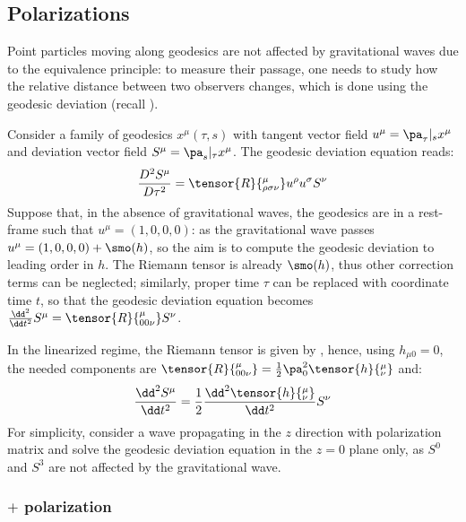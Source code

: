 \subsection{Polarizations}

Point particles moving along geodesics are not affected by gravitational waves due to the equivalence principle: to measure their passage, one needs to study how the relative distance between two observers changes, which is done using the geodesic deviation (recall ).

Consider a family of geodesics $ x^\mu(\tau,s) $ with tangent vector field $ u^\mu = \pa_\tau \vert_s x^\mu $ and deviation vector field $ S^\mu = \pa_s \vert_\tau x^\mu $. The geodesic deviation equation  reads:
\begin{equation*}
  \frac{D^2 S^\mu}{D \tau^2} = \tensor{R}{^\mu_{\rho \sigma \nu}} u^\rho u^\sigma S^\nu
\end{equation*}
Suppose that, in the absence of gravitational waves, the geodesics are in a rest-frame such that $ u^\mu = (1,0,0,0) $: as the gravitational wave passes $ u^\mu = (1,0,0,0) + \smo(h) $, so the aim is to compute the geodesic deviation to leading order in $ h $. The Riemann tensor is already $ \smo(h) $, thus other correction terms can be neglected; similarly, proper time $ \tau $ can be replaced with coordinate time $ t $, so that the geodesic deviation equation becomes $ \frac{\dd^2}{\dd t^2} S^\mu = \tensor{R}{^\mu_{00 \nu}} S^\nu $.

In the linearized regime, the Riemann tensor is given by , hence, using $ h_{\mu 0} = 0 $, the needed components are $ \tensor{R}{^\mu_{00 \nu}} = \frac{1}{2} \pa_0^2 \tensor{h}{^\mu_\nu} $ and:
\begin{equation}
  \frac{\dd^2 S^\mu}{\dd t^2} = \frac{1}{2} \frac{\dd^2 \tensor{h}{^\mu_\nu}}{\dd t^2} S^\nu
  \label{eq:weak-geodesic-deviation}
\end{equation}
For simplicity, consider a wave propagating in the $ z $ direction with polarization matrix  and solve the geodesic deviation equation in the $ z = 0 $ plane only, as $ S^0 $ and $ S^3 $ are not affected by the gravitational wave.

\subsubsection{\texorpdfstring{$ + $}{+} polarization}

